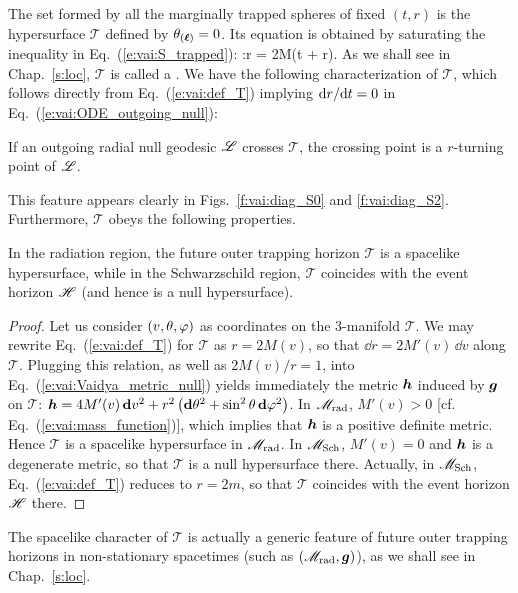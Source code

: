 The set formed by all the marginally trapped spheres
of fixed $(t,r)$
is the hypersurface $\mathscr{T}$ defined by $\theta_{(\bm{\ell})} = 0$.
Its equation is obtained by saturating the inequality
in Eq.~(\ref{e:vai:S_trapped}):
\be \label{e:vai:def_T}
    :\qquad r = 2M(t + r).
\ee
As we shall see in
Chap.~\ref{s:loc}, $\mathscr{T}$ is called a
.
We have the following characterization of $\mathscr{T}$, which follows directly
from Eq.~(\ref{e:vai:def_T}) implying $\mathrm{d} r / \mathrm{d} t = 0$ in Eq.~(\ref{e:vai:ODE_outgoing_null}):
\begin{greybox}
If an outgoing radial null geodesic $\mathscr{L}$ crosses $\mathscr{T}$,
the crossing point is a $r$-turning point of $\mathscr{L}$.
\end{greybox}
This feature appears clearly in Figs.~\ref{f:vai:diag_S0} and \ref{f:vai:diag_S2}.
Furthermore, $\mathscr{T}$ obeys the following properties.
\begin{greybox}
In the radiation region, the future outer trapping horizon $\mathscr{T}$ is a
spacelike hypersurface, while in the Schwarzschild region, $\mathscr{T}$
coincides with the event horizon $\mathscr{H}$ (and hence is a null hypersurface).
\end{greybox}
\begin{proof}
Let us consider $(v,\theta,\varphi)$ as coordinates on the 3-manifold $\mathscr{T}$.
We may rewrite Eq.~(\ref{e:vai:def_T}) for $\mathscr{T}$ as $r = 2M(v)$, so that
$\dd r = 2M'(v) \, \dd v$ along $\mathscr{T}$.
Plugging this relation, as well as $2M(v)/r=1$, into Eq.~(\ref{e:vai:Vaidya_metric_null})
yields immediately the metric $\bm{h}$ induced by $\bm{g}$ on $\mathscr{T}$:
$\bm{h} = 4 M'(v) \, \mathbf{d} v^2
        + r^2 \left( \mathbf{d}\theta^2 + \sin^2\theta\, \mathbf{d}\varphi^2 \right)$.
In $\mathscr{M}_{\rm rad}$, $M'(v) > 0$ [cf. Eq.~(\ref{e:vai:mass_function})], which
implies that $\bm{h}$ is a positive definite metric. Hence $\mathscr{T}$
is a spacelike hypersurface in $\mathscr{M}_{\rm rad}$. In $\mathscr{M}_{\rm Sch}$, $M'(v) = 0$ and $\bm{h}$
is a degenerate metric, so that $\mathscr{T}$ is a null hypersurface there.
Actually, in $\mathscr{M}_{\rm Sch}$, Eq.~(\ref{e:vai:def_T}) reduces
to $r = 2m$, so that $\mathscr{T}$ coincides with the event horizon $\mathscr{H}$ there.
\end{proof}

\begin{remark}
The spacelike character of $\mathscr{T}$ is actually a generic feature of future outer trapping horizons in non-stationary spacetimes (such as $(\mathscr{M}_{\rm rad},\bm{g})$),
as we shall see in Chap.~\ref{s:loc}.
\end{remark}

